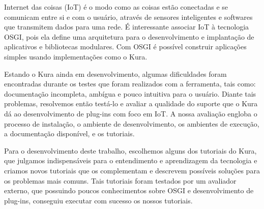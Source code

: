 Internet das coisas (IoT) é o modo como as coisas estão conectadas e se comunicam entre si e com o usuário, através de sensores inteligentes e softwares que transmitem dados para uma rede. É interessante associar IoT à tecnologia OSGI, pois ela define uma arquitetura para o desenvolvimento e implantação de aplicativos e bibliotecas modulares. Com OSGI é possível construir aplicações simples usando implementações como o Kura.

\setlength{\parindent}{5ex} Estando o Kura ainda em desenvolvimento, algumas dificuldades foram encontradas durante os testes que foram realizados com a ferramenta, tais como: documentação incompleta, ambígua e pouco intuitiva para o usuário. Diante tais problemas, resolvemos então testá-lo e avaliar a qualidade do suporte que o Kura dá ao desenvolvimento de plug-ins com foco em IoT. A nossa avaliação engloba o processo de instalação, o ambiente de desenvolvimento, os ambientes de execução, a documentação disponível, e os tutoriais. \par

Para o desenvolvimento deste trabalho, escolhemos alguns dos tutoriais do Kura, que julgamos indispensáveis para o entendimento e aprendizagem da tecnologia e criamos novos tutoriais que os complementam e descrevem possíveis soluções para os problemas mais comuns. Tais tutoriais foram testados por um avaliador externo, que possuindo poucos conhecimentos sobre OSGI e desenvolvimento de plug-ins, conseguiu executar com sucesso os nossos tutoriais. 